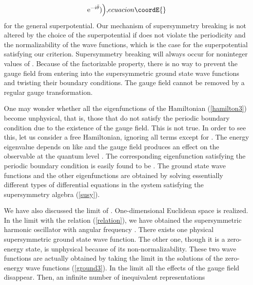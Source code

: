 \documentclass[a4paper,12pt]{article}
\begin{document}
{\begin{equation}
{\e^{-i{\bar\theta}}) \Bigr),
}{ecuacion}\coordE{}\end{equation} 
for the general superpotential.
Our mechanism of supersymmetry breaking is not altered by the 
choice of the superpotential
if \coordHE{} 
does not violate the periodicity and the 
normalizability of the wave functions, which is the case 
for the superpotential satisfying our criterion. 
Supersymmetry breaking will
always occur for noninteger values of \myHighlight{$\alpha$}\coordHE{}. 
Because of the factorizable property, there is no way to prevent 
the gauge field from entering into the supersymmetric ground state wave 
functions and twisting their boundary conditions. 
The gauge field cannot be removed by a regular gauge transformation.
\par
One may wonder whether all the eigenfunctions of the 
Hamiltonian (\ref{hamilton3}) become unphysical, that is, those that do not
satisfy the periodic boundary condition due to the existence of the 
gauge field. This is not true. In order to see this, 
let us consider a free Hamiltonian, ignoring all terms except for 
\coordHE{}. The energy eigenvalue depends on \myHighlight{$\alpha$}\coordHE{} like \coordHE{} and
the gauge field produces an effect on the observable at 
the quantum level \cite{tanimura}. 
The corresponding eigenfunction satisfying the periodic boundary condition 
is easily found to be \coordHE{}. 
The ground state wave functions and the other eigenfunctions 
are obtained by solving
essentially different types of differential equations in 
the system satisfying the supersymmetry algebra (\ref{susy}).
\par
We have also discussed the limit of \coordHE{}. 
One-dimensional Euclidean space is realized.
In the limit with the relation (\ref{relation}), we have obtained 
the supersymmetric 
harmonic oscillator with angular frequency \coordHE{}. 
There exists one physical supersymmetric ground state wave function. 
The other one, though it is a zero-energy state, is unphysical because of 
its non-normalizability. These two wave functions are actually 
obtained by taking the limit in the solutions of the zero-energy wave 
functions (\ref{ground3}).
In the limit all the effects of the gauge field \myHighlight{$\alpha$}\coordHE{} 
disappear. Then, an infinite number of inequivalent representations 
}
\end{document}
